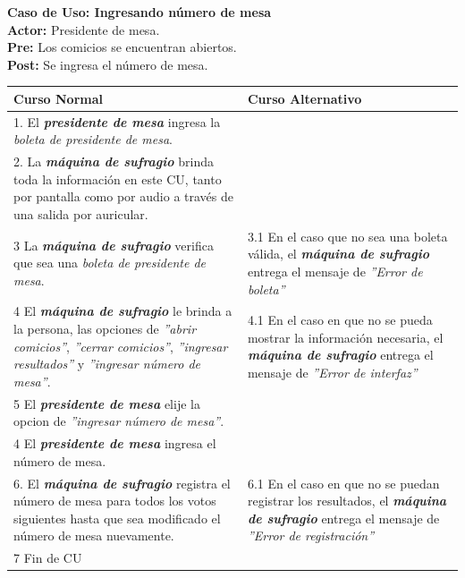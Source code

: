\documentclass[spanish, 10pt,a4paper]{article}
\numberwithin{equation}{section} %
\begin{document}
\noindent\textbf{Caso de Uso: Ingresando número de mesa}\\
\textbf{Actor: } Presidente de mesa.\\
\textbf{Pre: } Los comicios se encuentran abiertos.\\
\textbf{Post: } Se ingresa el número de mesa.\\
\begin{table}[H]
  \centering
\bgroup
\def\arraystretch{1.3}
  \begin{tabular}{p{9cm} | p{7cm}}
    \hline
    Curso Normal & Curso Alternativo \\
    \hline
    \hline    
    1. El \textbf{\textit{presidente de mesa}} ingresa la \textit{boleta de presidente de mesa}. 
    & \\
    
    \hline
    2. La \textbf{\textit{máquina de sufragio}} brinda toda la información en este CU, tanto por pantalla como por audio a través de una salida por auricular.
    &
    \\
    
    \hline
    3 La \textbf{\textit{máquina de sufragio}} verifica que sea una \textit{boleta de presidente de mesa}.
    & 
    3.1 En el caso que no sea una boleta válida, el \textbf{\textit{máquina de sufragio}} entrega el mensaje de \textit{''Error de boleta''}
    \\
    
    \hline
    4 El \textbf{\textit{máquina de sufragio}} le brinda a la persona, las opciones de \textit{''abrir comicios''}, \textit{''cerrar comicios''}, \textit{''ingresar resultados''} y \textit{''ingresar número de mesa''}.
    & 
    4.1 En el caso en que no se pueda mostrar la información necesaria, el \textbf{\textit{máquina de sufragio}} entrega el mensaje de \textit{''Error de interfaz''}
    \\
    
    \hline
    5 El \textbf{\textit{presidente de mesa}} elije la opcion de \textit{''ingresar número de mesa''}.
    & \\
    
    \hline
    4 El \textbf{\textit{presidente de mesa}} ingresa el número de mesa.
    \\
    
    \hline
    6. El \textbf{\textit{máquina de sufragio}} registra el número de mesa para todos los votos siguientes hasta que sea modificado el número de mesa nuevamente.
    &
    6.1 En el caso en que no se puedan registrar los resultados, el \textbf{\textit{máquina de sufragio}} entrega el mensaje de \textit{''Error de registración''}
    \\
    
    \hline
    7 Fin de CU
    & \\
    \hline
  \end{tabular}
\egroup
\end{table}
\end{document}
